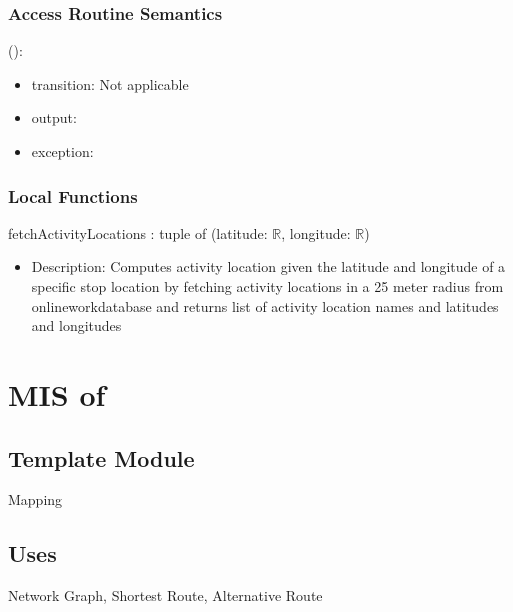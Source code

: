 \documentclass[12pt, titlepage]{article}
\begin{document}
\subsubsection{Access Routine Semantics}

\noindent {}():
\begin{itemize}
\item transition: Not applicable
\item output: 
\item exception:  
\end{itemize}

\subsubsection{Local Functions}
fetchActivityLocations : tuple of (latitude: $\mathbb{R}$, longitude: $\mathbb{R}$)
\begin{itemize}
    \item Description: Computes activity location given the latitude and longitude of a specific stop location by fetching activity locations in a 25 meter radius from onlineworkdatabase and returns list of activity location names and latitudes and longitudes
\end{itemize}
  
\newpage

\section{MIS of } \label{ModuleMapping} 

\subsection{Template Module}
Mapping

\subsection{Uses}%
Network Graph, Shortest Route, Alternative Route
\end{document}
